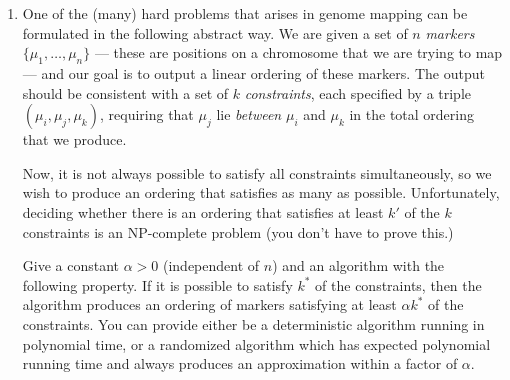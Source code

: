 \documentclass[12pt]{article}
\begin{document}
\begin{enumerate}
{}


\item 

One of the (many) hard problems that arises in
genome mapping can be formulated in the following abstract way.
We are given a set of $n$ {\em markers}
$\{\mu_1, \ldots, \mu_n\}$ --- these are positions
on a chromosome that we are trying to map ---
and our goal is to output a linear ordering of these markers.
The output should be consistent with a set of $k$ {\em constraints},
each specified by a triple $(\mu_i, \mu_j, \mu_k)$,
requiring that $\mu_j$ lie {\em between} $\mu_i$ and
$\mu_k$ in the total ordering that we produce.

Now, it is not always possible to satisfy all constraints
simultaneously, so we wish to produce an ordering that
satisfies as many as possible.
Unfortunately, deciding whether there is an ordering
that satisfies at least $k'$ of the $k$ constraints
is an NP-complete problem (you don't have to prove this.)

Give a constant $\alpha > 0$ (independent of $n$) and
an algorithm with the following property.
If it is possible to satisfy $k^*$ of the constraints,
then the algorithm produces an ordering of markers satisfying
at least $\alpha k^*$ of the constraints.
You can provide either be a deterministic
algorithm running in polynomial time,
or a randomized algorithm which has
expected polynomial running time and
always produces an approximation within a factor of $\alpha$.

\end{enumerate}
\end{document}
